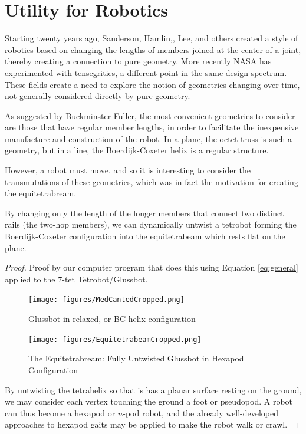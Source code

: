 \documentclass[review]{siamonline1116}
\begin{document}
\section{Utility for Robotics}

Starting twenty years ago, Sanderson\cite{sanderson1996modular},
Hamlin,\cite{TetrobotBook}, Lee\cite{lee2002dynamic}, and others
 created a style of robotics based on changing
the lengths of members joined at the center of a joint, thereby
creating a connection to pure geometry. More recently NASA has
experimented with tensegrities\cite{NTRT}, a different point in the
same design spectrum. These fields create a need to explore the notion
of geometries changing over time, not generally considered directly by
pure geometry.

As suggested by Buckminster Fuller, the most convenient geometries to
consider are those that have regular member lengths, in order to
facilitate the inexpensive manufacture and construction of the robot.
In a plane, the octet truss\cite{richard1961synergetic} is such a geometry, but in a line, the
Boerdijk-Coxeter helix is a regular structure.

However, a robot must move, and so it is interesting to consider the
transmutations of these geometries, which was in fact the motivation
for creating the equitetrabream.

\begin{theorem}
  By changing only the length of the longer members that connect two distinct rails (the two-hop members), we can dynamically untwist a tetrobot
  forming the Boerdijk-Coxeter configuration into the equitetrabeam which rests flat on the plane.
\end{theorem}

\begin{proof}
  Proof by our computer program that does this using Equation \eqref{eq:general} applied to the
  7-tet Tetrobot/Glussbot.

\begin{figure}[H] %
  \centering
     \texttt{[image: figures/MedCantedCropped.png]}
     \caption{Glussbot in relaxed, or BC helix configuration}
     \texttt{[image: figures/EquitetrabeamCropped.png]}
     \caption{The Equitetrabream: Fully Untwisted Glussbot in Hexapod Configuration}
     \label{fig:glussbot}
\end{figure}

By untwisting the tetrahelix so that is has a planar surface resting on the ground,
we may consider each vertex touching the ground a foot or pseudopod. A robot can thus
become a hexapod or $n$-pod robot, and the already well-developed approaches to
hexapod gaits may be applied to make the robot walk or crawl.

\end{proof}
\end{document}
